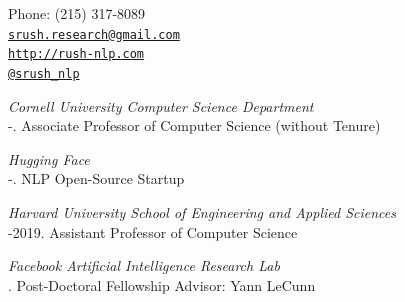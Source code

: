 \documentclass[10pt]{article}
\makeatletter
\def\myemail{srush.research@gmail.com}
\def\myweb{http://rush-nlp.com}
\def\myphone{(215) 317-8089}
\def\myfax{srush\_nlp}
\makeatother
\begin{document}
\begin{minipage}[t]{3.2in}


\end{minipage}
\hfill
\hfill
\begin{minipage}[t]{1.7in}
  \flushright \footnotesize Phone: \myphone \\
  {\scriptsize  \texttt{\href{mailto:\myemail}{\myemail}}} \\
  {\scriptsize  \texttt{\href{\myweb}{\myweb}}} \\
  {\scriptsize  \texttt{\href{http://twitter.com/\myfax}{@\myfax}}} \\
\end{minipage}



\reversemarginpar

\medskip

\noindent\emph{Cornell University Computer Science Department \vspace{0.01in}}\\
-.  Associate Professor of Computer Science (without Tenure)

\medskip
\noindent\emph{Hugging Face \vspace{0.01in}}\\
-.  NLP Open-Source Startup

\medskip
\noindent\emph{Harvard University School of Engineering and Applied Sciences \vspace{0.01in}}\\
-2019.  Assistant Professor of Computer Science

\medskip
\noindent\emph{Facebook Artificial Intelligence Research Lab \vspace{0.01in}}\\
.  Post-Doctoral Fellowship Advisor: Yann LeCunn

\bigskip
\end{document}
